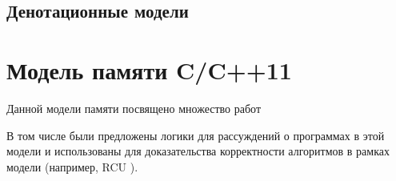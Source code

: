\subsection{Денотационные модели}

\section{Модель памяти C/C++11}
\label{sec:cppmodel}

Данной модели памяти посвящено множество работ
\cite{Batty-al:POPL12,Batty-al:POPL13,Lahav-al:PLDI17,Chakraborty-Vafeiadis:CGO16,Vafeiadis-al:POPL15,Vafeiadis:CPP15}

В том числе были предложены логики для рассуждений о программах в этой модели
\cite{Turon-al:OOPSLA14,Vafeiadis-Narayan:OOPSLA13,Lahav-Vafeiadis:ICALP15,Doko-Vafeiadis:VMCAI16}
и использованы для доказательства корректности
алгоритмов в рамках модели (например, RCU \cite{Tassarotti-al:PLDI15,Doko-Vafeiadis:ESOP17}).


